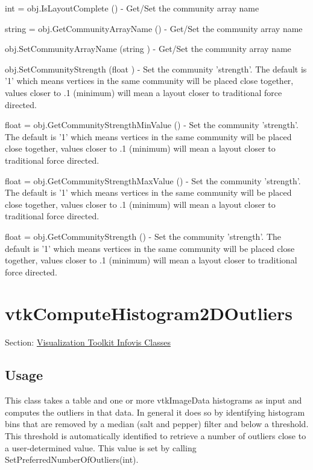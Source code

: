 \begin{DoxyItemize}
\item {\ttfamily int = obj.\-Is\-Layout\-Complete ()} -\/ Get/\-Set the community array name  
\item {\ttfamily string = obj.\-Get\-Community\-Array\-Name ()} -\/ Get/\-Set the community array name  
\item {\ttfamily obj.\-Set\-Community\-Array\-Name (string )} -\/ Get/\-Set the community array name  
\item {\ttfamily obj.\-Set\-Community\-Strength (float )} -\/ Set the community 'strength'. The default is '1' which means vertices in the same community will be placed close together, values closer to .1 (minimum) will mean a layout closer to traditional force directed.  
\item {\ttfamily float = obj.\-Get\-Community\-Strength\-Min\-Value ()} -\/ Set the community 'strength'. The default is '1' which means vertices in the same community will be placed close together, values closer to .1 (minimum) will mean a layout closer to traditional force directed.  
\item {\ttfamily float = obj.\-Get\-Community\-Strength\-Max\-Value ()} -\/ Set the community 'strength'. The default is '1' which means vertices in the same community will be placed close together, values closer to .1 (minimum) will mean a layout closer to traditional force directed.  
\item {\ttfamily float = obj.\-Get\-Community\-Strength ()} -\/ Set the community 'strength'. The default is '1' which means vertices in the same community will be placed close together, values closer to .1 (minimum) will mean a layout closer to traditional force directed.  
\end{DoxyItemize}\hypertarget{vtkinfovis_vtkcomputehistogram2doutliers}{}\section{vtk\-Compute\-Histogram2\-D\-Outliers}\label{vtkinfovis_vtkcomputehistogram2doutliers}
Section\-: \hyperlink{sec_vtkinfovis}{Visualization Toolkit Infovis Classes} \hypertarget{vtkwidgets_vtkxyplotwidget_Usage}{}\subsection{Usage}\label{vtkwidgets_vtkxyplotwidget_Usage}
This class takes a table and one or more vtk\-Image\-Data histograms as input and computes the outliers in that data. In general it does so by identifying histogram bins that are removed by a median (salt and pepper) filter and below a threshold. This threshold is automatically identified to retrieve a number of outliers close to a user-\/determined value. This value is set by calling Set\-Preferred\-Number\-Of\-Outliers(int).


